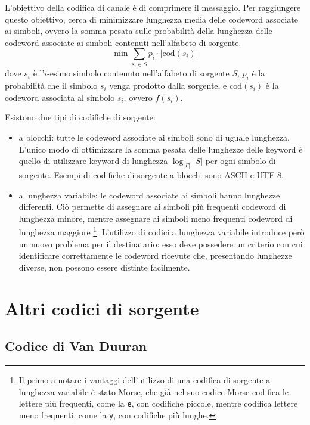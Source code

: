 L'obiettivo della codifica di canale è di comprimere il messaggio. Per
raggiungere questo obiettivo, cerca di minimizzare lunghezza media
delle codeword associate ai simboli, ovvero la somma pesata sulle
probabilità della lunghezza delle codeword associate ai simboli contenuti
nell'alfabeto di sorgente.
\[
    \min \sum_{s_i \in S} p_i \cdot |\text{cod}(s_i)|
\]
dove $s_i$ è l'$i$-esimo simbolo contenuto nell'alfabeto di sorgente $S$,
$p_i$ è la probabilità che il simbolo $s_i$ venga prodotto dalla sorgente,
e $\text{cod}(s_i)$ è la codeword associata al simbolo $s_i$, ovvero $f(s_i)$.

Esistono due tipi di codifiche di sorgente:
\begin{itemize}
    \item a blocchi: tutte le codeword associate ai simboli sono di uguale
    lunghezza. L'unico modo di ottimizzare la somma pesata delle lunghezze delle
    keyword è quello di utilizzare keyword di lunghezza $\log_{|\Gamma|}|S|$
    per ogni simbolo di sorgente.
    Esempi di codifiche di sorgente a blocchi sono ASCII e UTF-8.
    \item a lunghezza variabile: le codeword associate ai simboli hanno
    lunghezze differenti. Ciò permette di assegnare ai simboli più
    frequenti codeword di lunghezza minore, mentre assegnare ai simboli
    meno frequenti codeword di lunghezza maggiore \footnote{
    Il primo a notare i vantaggi dell'utilizzo di una codifica di sorgente
    a lunghezza variabile è stato Morse, che già nel suo codice Morse codifica
    le lettere più frequenti, come la \verb|e|, con codifiche piccole, mentre
    codifica lettere meno frequenti, come la \verb|y|, con codifiche più lunghe.}.
    L'utilizzo di codici a lunghezza variabile introduce però un nuovo
    problema per il destinatario: esso deve possedere un criterio con cui
    identificare correttamente le codeword ricevute che, presentando
    lunghezze diverse, non possono essere distinte facilmente.
\end{itemize}

\section{Altri codici di sorgente}
\subsection{Codice di Van Duuran}
